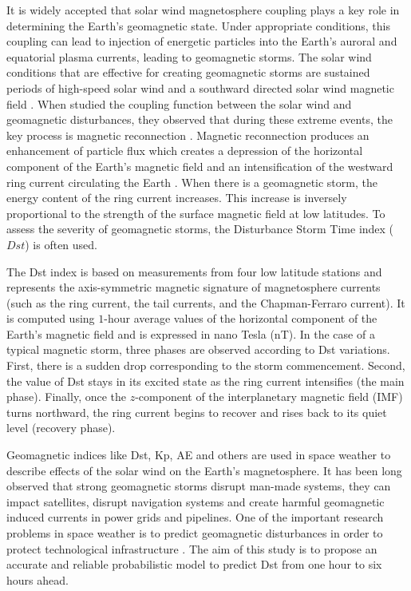 It is widely accepted that solar wind magnetosphere coupling plays a key role in determining the 
Earth’s geomagnetic state. Under appropriate conditions, this coupling can lead to injection of 
energetic particles into the Earth’s auroral and equatorial plasma currents, leading to geomagnetic 
storms. The solar wind conditions that are effective for creating geomagnetic storms are sustained 
periods of high-speed solar wind and a southward directed solar wind magnetic field 
\citep{JGR:JGR10260}. When \citet{1981AkasofuE} studied the coupling function between the solar 
wind and geomagnetic disturbances, they observed that during these extreme events, the key process 
is magnetic reconnection \citep{magneticreconnection}. Magnetic reconnection produces an 
enhancement of particle flux which creates a depression of the horizontal component of the Earth’s 
magnetic field and an intensification of the westward ring current circulating the Earth 
\citep{JGRA:JGRA11775}. When there is a geomagnetic storm, the energy content of the ring current 
increases. This increase is inversely proportional to the strength of the surface magnetic field at 
low latitudes. To assess the severity of geomagnetic storms, the Disturbance Storm Time index 
($Dst$) is often used. 

The Dst index \citep{Sugiura1964} is based on measurements from four low latitude stations and 
represents the axis-symmetric magnetic signature of magnetosphere currents (such as the ring current, 
the tail currents, and the Chapman-Ferraro current). It is computed using $1$-hour average values of the 
horizontal component of the Earth’s magnetic field and is expressed in nano Tesla (nT). In the case of a 
typical magnetic storm, three phases are observed according to Dst variations. First, there is a sudden drop 
corresponding to the storm commencement. Second, the value of Dst stays in its excited state as the ring current 
intensifies (the main phase). Finally, once the $z$-component of the interplanetary magnetic field (IMF) turns 
northward, the ring current begins to recover and rises back to its quiet level (recovery phase). 

Geomagnetic indices like Dst, Kp, AE and others are used in space weather to describe effects of the solar wind on 
the Earth's magnetosphere. It has been long observed that strong geomagnetic storms disrupt man-made systems, 
they can impact satellites, disrupt navigation systems and create harmful geomagnetic induced currents in power grids 
and pipelines. One of the important research problems in space weather is to predict geomagnetic disturbances 
in order to protect technological infrastructure \citep{Singh2010}. The aim of this study is to propose an 
accurate and reliable probabilistic model to predict Dst from one hour to six hours ahead. 

